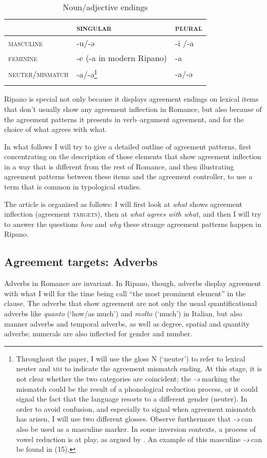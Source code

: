 \documentclass[output=paper
,modfonts
,nonflat]{langsci/langscibook}
\begin{document}
	\begin{table}
		\caption{Noun/adjective endings}
		\label{tab-dalessandro:2}
		\begin{tabular}{lll}
			\lsptoprule
			 & \textsc{singular} & \textsc{plural}\\
			\midrule
			\textsc{masculine} & -u/-ə & -i /-a\\
			\textsc{feminine} & -e (-a in modern Ripano) & -a\\
			\textsc{neuter/mismatch} & -a/-ə\footnote{Throughout the paper, I will use the gloss N (‘neuter’) to refer to lexical neuter and \textsc{mm}  to indicate the agreement mismatch ending. At this stage, it is not clear whether the two categories are coincident; the \textit{-ə} marking the mismatch could be the result of a phonological reduction process, or it could signal the fact that the language resorts to a different gender (neuter). In order to avoid confusion, and especially to signal when agreement mismatch has arisen, I will use two different glosses. 
Observe furthermore that \textit{-ə} can also be used as a masculine marker. In some inversion contexts, a process of vowel reduction is at play, as argued by \citet{Paciaroni2017}. An example of this masculine \textit{-ə} can be found in (15).} & -a/-ə\\
			\lspbottomrule
		\end{tabular}
	\end{table}

Ripano is special not only because it displays agreement endings on lexical items that don’t usually show any agreement inflection in Romance, but also because of the agreement patterns it presents in verb--argument agreement, and for the choice of what agrees with what.

In what follows I will try to give a detailed outline of agreement patterns, first concentrating on the description of those elements that show agreement inflection in a way that is different from the rest of Romance, and then illustrating agreement patterns between these items and the agreement controller, to use a term that is common in typological studies.

The article is organized as follows: I will first look at \textit{what} shows agreement inflection (agreement \textsc{targets}), then at \textit{what agrees with what}, and then I will try to answer the questions \textit{how} and \textit{why} these strange agreement patterns happen in Ripano. 

\subsection{Agreement targets: Adverbs} \label{sec-dalessandro:1.2}
Adverbs in Romance are invariant. In Ripano, though, adverbs display agreement with what I will for the time being call “the most prominent element” in the clause. The adverbs that show agreement are not only the usual quantificational adverbs like \textit{quanto} (‘how/as much’) and \textit{molto} (‘much’) in Italian, but also manner adverbs and temporal adverbs, as well as degree, spatial and quantity adverbs; numerals are also inflected for gender and number.
\end{document}
